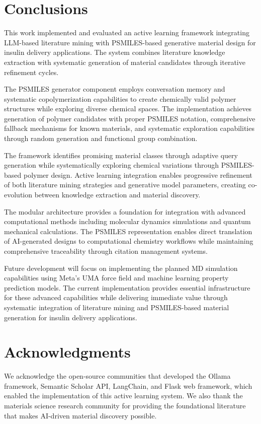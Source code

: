 \documentclass[]{fairmeta}
\begin{document}
\section{Conclusions}

This work implemented and evaluated an active learning framework integrating LLM-based literature mining with PSMILES-based generative material design for insulin delivery applications. The system combines literature knowledge extraction with systematic generation of material candidates through iterative refinement cycles.

The PSMILES generator component employs conversation memory and systematic copolymerization capabilities to create chemically valid polymer structures while exploring diverse chemical spaces. The implementation achieves generation of polymer candidates with proper PSMILES notation, comprehensive fallback mechanisms for known materials, and systematic exploration capabilities through random generation and functional group combination.

The framework identifies promising material classes through adaptive query generation while systematically exploring chemical variations through PSMILES-based polymer design. Active learning integration enables progressive refinement of both literature mining strategies and generative model parameters, creating co-evolution between knowledge extraction and material discovery.

The modular architecture provides a foundation for integration with advanced computational methods including molecular dynamics simulations and quantum mechanical calculations. The PSMILES representation enables direct translation of AI-generated designs to computational chemistry workflows while maintaining comprehensive traceability through citation management systems.

Future development will focus on implementing the planned MD simulation capabilities using Meta's UMA force field and machine learning property prediction models. The current implementation provides essential infrastructure for these advanced capabilities while delivering immediate value through systematic integration of literature mining and PSMILES-based material generation for insulin delivery applications.

\section{Acknowledgments}

We acknowledge the open-source communities that developed the Ollama framework, Semantic Scholar API, LangChain, and Flask web framework, which enabled the implementation of this active learning system. We also thank the materials science research community for providing the foundational literature that makes AI-driven material discovery possible.



\end{document}
